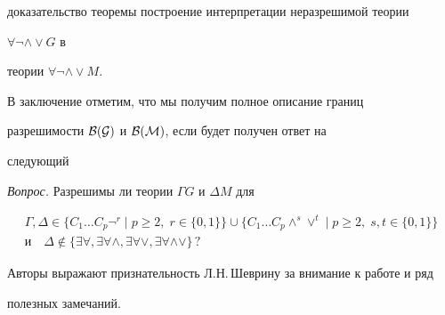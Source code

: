 доказательство теоремы построение интерпретации неразрешимой теории 


$\forall\neg\wedge\vee G$ в 


теории $\forall\neg\wedge\vee M$. 


 


В заключение отметим, что мы получим полное описание границ 


разрешимости $\cal B(G)$ и $\cal B(M)$, если будет получен ответ на 


следующий 


\medskip 


 


{\it Вопрос.} Разрешимы ли теории $\Gamma G$ и $\Delta M$ для 


\begin{gather*} 


\Gamma,\Delta\in\{C_1\dotsc C_p\neg^r\mid 


p\ge 2,\;r\in\{0,1\}\}\cup\{C_1\dotsc C_p 


\wedge^s\vee^t\mid p\ge 2,\;s,t\in\{0,1\}\}\\


\text{и} \quad 


\Delta\notin\{\exists\forall,\exists\forall\wedge, 


\exists\forall\vee,\exists\forall\wedge\vee\}\,? 


\end{gather*} 


 


Авторы выражают признательность Л.Н.\,Шеврину за внимание к работе и ряд 


полезных замечаний. 


 


 


